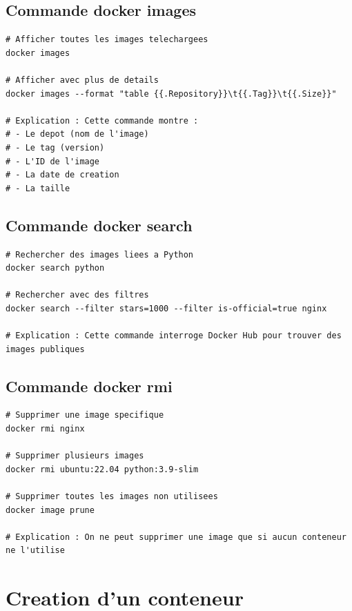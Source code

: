 \documentclass[a4paper,12pt]{article}
\begin{document}
\subsection{Commande docker images}
\begin{lstlisting}[caption=Lister les images disponibles]
# Afficher toutes les images telechargees
docker images

# Afficher avec plus de details
docker images --format "table {{.Repository}}\t{{.Tag}}\t{{.Size}}"

# Explication : Cette commande montre :
# - Le depot (nom de l'image)
# - Le tag (version)
# - L'ID de l'image
# - La date de creation
# - La taille
\end{lstlisting}

\subsection{Commande docker search}
\begin{lstlisting}[caption=Chercher des images sur Docker Hub]
# Rechercher des images liees a Python
docker search python

# Rechercher avec des filtres
docker search --filter stars=1000 --filter is-official=true nginx

# Explication : Cette commande interroge Docker Hub pour trouver des images publiques
\end{lstlisting}

\subsection{Commande docker rmi}
\begin{lstlisting}[caption=Supprimer des images]
# Supprimer une image specifique
docker rmi nginx

# Supprimer plusieurs images
docker rmi ubuntu:22.04 python:3.9-slim

# Supprimer toutes les images non utilisees
docker image prune

# Explication : On ne peut supprimer une image que si aucun conteneur ne l'utilise
\end{lstlisting}

\section{Creation d'un conteneur}
\end{document}
